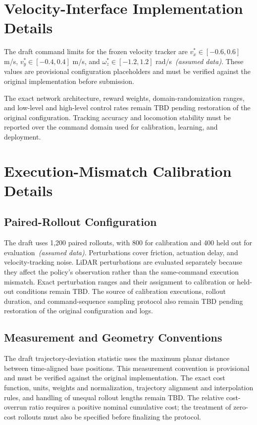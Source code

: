 \documentclass{article}
\begin{document}
\clearpage
\appendix
\section{Velocity-Interface Implementation Details}
\label{app:velocity_interface}
The draft command limits for the frozen velocity tracker are
$v_x^*\in[-0.6,0.6]$ m/s, $v_y^*\in[-0.4,0.4]$ m/s, and
$\omega_z^*\in[-1.2,1.2]$ rad/s~\textit{(assumed data)}. These values are
provisional configuration placeholders and must be verified against the original
implementation before submission.

The exact network architecture, reward weights, domain-randomization ranges, and
low-level and high-level control rates remain \textsc{TBD} pending restoration of
the original configuration. Tracking accuracy and locomotion stability must be
reported over the command domain used for calibration, learning, and deployment.

\section{Execution-Mismatch Calibration Details}
\label{app:calibration_details}
\subsection{Paired-Rollout Configuration}
The draft uses 1,200 paired rollouts, with 800 for calibration and 400 held out for
evaluation~\textit{(assumed data)}. Perturbations cover friction, actuation delay,
and velocity-tracking noise. LiDAR perturbations are evaluated separately because
they affect the policy's observation rather than the same-command execution
mismatch. Exact perturbation ranges and their assignment to calibration or
held-out conditions remain \textsc{TBD}. The source of calibration executions,
rollout duration, and command-sequence sampling protocol also remain \textsc{TBD}
pending restoration of the original configuration and logs.

\subsection{Measurement and Geometry Conventions}
The draft trajectory-deviation statistic uses the maximum planar distance between
time-aligned base positions. This measurement convention is provisional and must
be verified against the original implementation. The exact cost function, units,
weights and normalization, trajectory alignment and interpolation rules, and
handling of unequal rollout lengths remain \textsc{TBD}. The relative cost-overrun
ratio requires a positive nominal cumulative cost; the treatment of zero-cost
rollouts must also be specified before finalizing the protocol.
\end{document}
